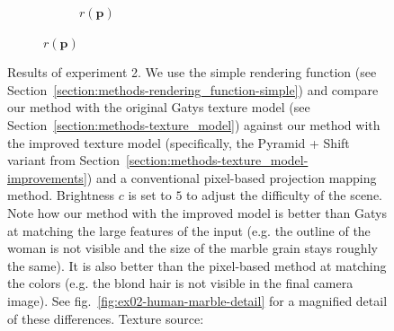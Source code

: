 \begin{figure}[]
\begin{subfigure}{\textwidth}
\begin{subfigure}{0.24\textwidth}
            \caption*{\(r(\bm{p})\)}
        \end{subfigure}
    \end{subfigure}
    \caption{Results of experiment 2. We use the simple rendering function (see Section~\ref{section:methods-rendering_function-simple}) and compare our method with the original Gatys texture model (see Section~\ref{section:methods-texture_model}) against our method with the improved texture model (specifically, the Pyramid + Shift variant from Section~\ref{section:methods-texture_model-improvements}) and a conventional pixel-based projection mapping method. Brightness \(c\) is set to \(5\) to adjust the difficulty of the scene. Note how our method with the improved model is better than Gatys at matching the large features of the input (e.g. the outline of the woman is not visible and the size of the marble grain stays roughly the same). It is also better than the pixel-based method at matching the colors (e.g. the blond hair is not visible in the final camera image). See fig.~\ref{fig:ex02-human-marble-detail} for a magnified detail of these differences. Texture source: \citet{Pixar128}}

\end{figure}
